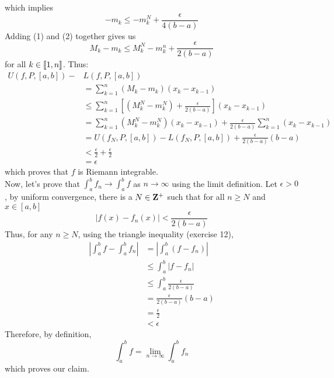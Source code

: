 \begin{solution}
    which implies
    \[-m_k \leq -m_k^N + \frac{\epsilon}{4(b-a)} \tag*{(2)}\]
    Adding (1) and (2) together gives us
    $$M_k - m_k \leq M_k^N - m_k^n + \frac{\epsilon}{2(b-a)}$$
    for all $k \in \llbracket 1 , n \rrbracket$. Thus:
    \begin{align*}
        U(f, P, [a,b]) - &L(f, P, [a,b]) \\
        &= \sum_{k=1}^{n}(M_k - m_k)(x_k - x_{k-1}) \\
        &\leq \sum_{k=1}^{n}\left[(M_k^N - m_k^N) + \frac{\epsilon}{2(b-a)}\right](x_k - x_{k-1}) \\
        &= \sum_{k=1}^{n}(M_k^N - m_k^N)(x_k - x_{k-1}) + \frac{\epsilon}{2(b-a)}\sum_{k=1}^{n}(x_k - x_{k-1}) \\
        &= U(f_N, P, [a,b]) - L(f_N, P, [a,b]) + \frac{\epsilon}{2(b-a)}(b-a) \\
        &< \frac{\epsilon}{2} + \frac{\epsilon}{2} \\
        &= \epsilon
    \end{align*}
    which proves that $f$ is Riemann integrable. \\
    Now, let's prove that $\int_{a}^{b}f_n \rightarrow \int_{a}^{b}f$ as $n \rightarrow \infty$ using the limit definition. Let $\epsilon > 0$, by uniform convergence, there is a $N \in \mathbf{Z}^+$ such that for all $n \geq N$ and $x \in [a,b]$
    $$\left| f(x) - f_n(x) \right| < \frac{\epsilon}{2(b-a)}$$
    Thus, for any $n \geq N$, using the triangle inequality (exercise 12),
    \begin{align*}
        \left| \int_{a}^{b}f - \int_{a}^{b}f_n \right| &= \left| \int_{a}^{b}(f - f_n) \right| \\
        &\leq \int_{a}^{b}|f - f_n| \\
        &\leq \int_{a}^{b} \frac{\epsilon}{2(b-a)} \\
        &= \frac{\epsilon}{2(b-a)}(b-a) \\
        &= \frac{\epsilon}{2} \\
        &< \epsilon
    \end{align*}
    Therefore, by definition,
    $$\int_{a}^{b}f = \lim_{n \rightarrow \infty}\int_{a}^{b}f_n$$
    which proves our claim.
 \end{solution}